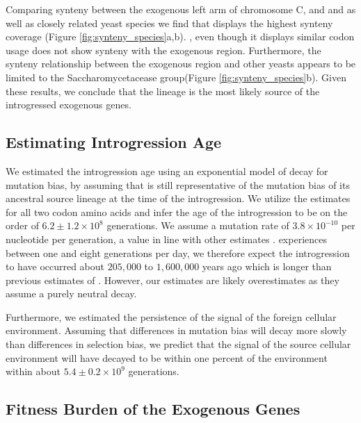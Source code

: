 Comparing synteny between the exogenous left arm of chromosome C, and \gossypii and \dubl as well as closely related yeast species we find that \gossypii displays the highest synteny coverage  (Figure \ref{fig:synteny_species}a,b).
\dubl, even though it displays similar codon usage does not show synteny with the exogenous region.
Furthermore, the synteny relationship between the exogenous region and other yeasts appears to be limited to the Saccharomycetacease group(Figure \ref{fig:synteny_species}b).
Given these results, we conclude that the \gossypii lineage is the most likely source of the introgressed exogenous genes.

\subsection{Estimating Introgression Age}

We estimated the introgression age using an exponential model of decay for mutation bias, by assuming that \gossypii is still representative of the mutation bias of its ancestral source lineage at the time of the introgression.
We utilize the \DM estimates for all two codon amino acids and infer the age of the introgression to be on the order of $6.2\pm1.2\times 10^8$ generations. 
We assume a mutation rate of $3.8\times 10^{-10}$ per nucleotide per generation, a value in line with other estimates \citep{zhu2014, lang2008}.
\kluyveri experiences between one and eight generations per day, we therefore expect the introgression to have occurred about $205,000$ to $1,600,000$ years ago which is  longer than previous estimates of \citet{friedrich2015}.
However, our estimates are likely overestimates as they assume a purely neutral decay.

Furthermore, we estimated the persistence of the signal of the foreign cellular environment.
Assuming that differences in mutation bias will decay more slowly than differences in selection bias, we predict that the \DM signal of the source cellular environment will have decayed to be within one percent of the \kluyveri environment within about $5.4\pm0.2\times 10^9 $ generations.

\subsection{Fitness Burden of the Exogenous Genes}

